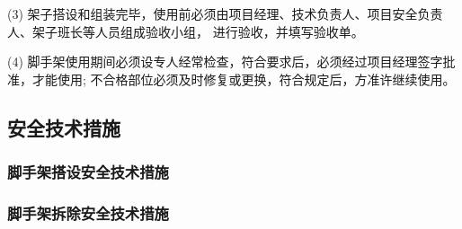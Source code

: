 (3) 架子搭设和组装完毕，使用前必须由项目经理、技术负责人、项目安全负责人、架子班长等人员组成验收小组，
进行验收，并填写验收单。

(4) 脚手架使用期间必须设专人经常检查，符合要求后，必须经过项目经理签字批准，才能使用;
不合格部位必须及时修复或更换，符合规定后，方准许继续使用。 

\subsection{安全技术措施}
\subsubsection{脚手架搭设安全技术措施}

\subsubsection{脚手架拆除安全技术措施}
